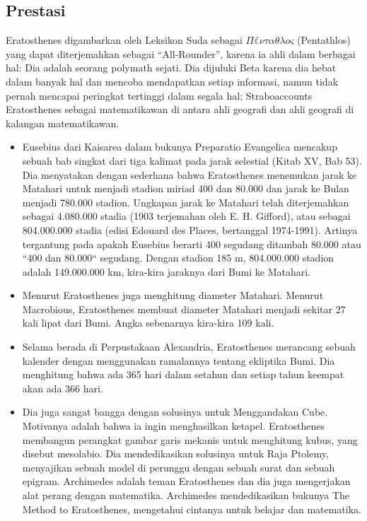 \subsection{Prestasi}
Eratosthenes digambarkan oleh Leksikon Suda sebagai $Πένταθλος$ (Pentathlos) yang dapat diterjemahkan sebagai ``All-Rounder'', karena ia ahli dalam berbagai hal: Dia adalah seorang polymath sejati. Dia dijuluki Beta karena dia hebat dalam banyak hal dan mencoba mendapatkan setiap informasi, namun tidak pernah mencapai peringkat tertinggi dalam segala hal; Straboaccounts Eratosthenes sebagai matematikawan di antara ahli geografi dan ahli geografi di kalangan matematikawan.
\begin{itemize}
\item Eusebius dari Kaisarea dalam bukunya Preparatio Evangelica mencakup sebuah bab singkat dari tiga kalimat pada jarak selestial (Kitab XV, Bab 53). Dia menyatakan dengan sederhana bahwa Eratosthenes menemukan jarak ke Matahari untuk menjadi stadion miriad 400 dan 80.000 dan jarak ke Bulan menjadi 780.000 stadion. Ungkapan jarak ke Matahari telah diterjemahkan sebagai 4.080.000 stadia (1903 terjemahan oleh E. H. Gifford), atau sebagai 804.000.000 stadia (edisi Edouard des Places, bertanggal 1974-1991). Artinya tergantung pada apakah Eusebius berarti 400 segudang ditambah 80.000 atau ``400 dan 80.000`` segudang. Dengan stadion 185 m, 804.000.000 stadion adalah 149.000.000 km, kira-kira jaraknya dari Bumi ke Matahari.
\item Menurut \cite{smith2005dictionary} Eratosthenes juga menghitung diameter Matahari. Menurut Macrobious, Eratosthenes membuat diameter Matahari menjadi sekitar 27 kali lipat dari Bumi. Angka sebenarnya kira-kira 109 kali.
\item Selama berada di Perpustakaan Alexandria, Eratosthenes merancang sebuah kalender dengan menggunakan ramalannya tentang ekliptika Bumi. Dia menghitung bahwa ada 365 hari dalam setahun dan setiap tahun keempat akan ada 366 hari.
\item Dia juga sangat bangga dengan solusinya untuk Menggandakan Cube. Motivanya adalah bahwa ia ingin menghasilkan ketapel. Eratosthenes membangun perangkat gambar garis mekanis untuk menghitung kubus, yang disebut mesolabio. Dia mendedikasikan solusinya untuk Raja Ptolemy, menyajikan sebuah model di perunggu dengan sebuah surat dan sebuah epigram. Archimedes adalah teman Eratosthenes dan dia juga mengerjakan alat perang dengan matematika. Archimedes mendedikasikan bukunya The Method to Eratosthenes, mengetahui cintanya untuk belajar dan matematika. \cite{chondros2010archimedes}
\end{itemize}
